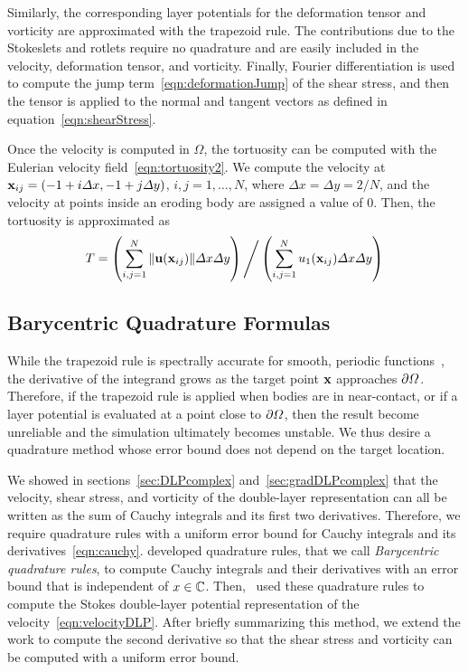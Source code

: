 \documentclass{jfm}
\begin{document}
Similarly, the corresponding layer potentials for the deformation tensor
and vorticity are approximated with the trapezoid rule. The
contributions due to the Stokeslets and rotlets require no quadrature
and are easily included in the velocity, deformation tensor, and
vorticity.  Finally, Fourier differentiation is used to compute the jump
term~\eqref{eqn:deformationJump} of the shear stress, and then the
tensor is applied to the normal and tangent vectors as defined in
equation~\eqref{eqn:shearStress}.

Once the velocity is computed in $\Omega$, the tortuosity can be
computed with the Eulerian velocity field~\eqref{eqn:tortuosity2}.  We
compute the velocity at ${\mathbf{x}}_{ij} = (-1 + i\varDelta x, -1 + j\varDelta y)$,
$i,j=1,\ldots,N$, where $\Delta x = \Delta y = 2/N$, and the velocity at
points inside an eroding body are assigned a value of 0.  Then, the
tortuosity is approximated as
\begin{align}
  T = \left(\sum_{i,j=1}^N \|{\mathbf{u}}({\mathbf{x}}_{ij})\|\varDelta x \varDelta y \right) 
      \Bigg/ 
      \left(\sum_{i,j=1}^N u_1({\mathbf{x}}_{ij}) \varDelta x \varDelta y \right)
\end{align}

\subsection{Barycentric Quadrature Formulas}
\label{sec:bary}
While the trapezoid rule is spectrally accurate for smooth, periodic
functions~\citep{tre-wei2014}, the derivative of the integrand grows as
the target point ${\mathbf{x}}$ approaches ${\partial}\varOmega$.  Therefore, if the
trapezoid rule is applied when bodies are in near-contact, or if a layer
potential is evaluated at a point close to ${\partial}\varOmega$, then the result
become unreliable and the simulation ultimately becomes unstable.  We
thus desire a quadrature method whose error bound does not depend on the
target location.

We showed in sections~\ref{sec:DLPcomplex} and~\ref{sec:gradDLPcomplex}
that the velocity, shear stress, and vorticity of the double-layer
representation can all be written as the sum of Cauchy integrals and its
first two derivatives.  Therefore, we require quadrature rules with a
uniform error bound for Cauchy integrals and its
derivatives~\eqref{eqn:cauchy}. \citet{ioa-pap-per1991} developed
quadrature rules, that we call {\em Barycentric quadrature rules}, to
compute Cauchy integrals and their derivatives with an error bound that
is independent of $x \in {\mathbb{C}}$.  Then,~\citet{bar-wu-vee2015} used these
quadrature rules to compute the Stokes double-layer potential
representation of the velocity~\eqref{eqn:velocityDLP}. After briefly
summarizing this method, we extend the work to compute the second
derivative so that the shear stress and vorticity can be computed with a
uniform error bound. 
\end{document}
